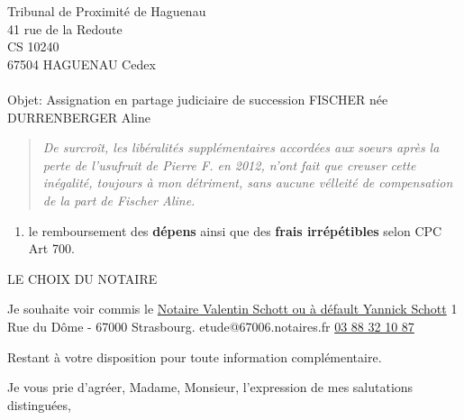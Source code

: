 \documentclass[
]{letter}
\providecommand{\tightlist}{%
  \setlength{\itemsep}{0pt}\setlength{\parskip}{0pt}}\usepackage{longtable,booktabs,array}
\begin{document}
\begin{letter}{Tribunal de Proximité de Haguenau\\41 rue de la
Redoute\\CS 10240\\67504 HAGUENAU Cedex\\ ~ \\Objet: Assignation en
partage judiciaire de succession FISCHER née DURRENBERGER Aline}
\begin{quote}
\emph{De surcroît, les libéralités supplémentaires accordées aux soeurs
après la perte de l'usufruit de Pierre F. en 2012, n'ont fait que
creuser cette inégalité, toujours à mon détriment, sans aucune vélleité
de compensation de la part de Fischer Aline.}
\end{quote}

\begin{enumerate}
\def\labelenumi{\arabic{enumi}.}
\setcounter{enumi}{2}
\tightlist
\item
  le remboursement des \textbf{dépens} ainsi que des \textbf{frais
  irrépétibles} selon CPC Art 700.
\end{enumerate}

LE CHOIX DU NOTAIRE

Je souhaite voir commis le
\href{https://www.bing.com/ck/a?!&&p=f2066ee7e9a9fe535e713659e0db4ee90bd39e3fa6431940c2eba6275c4f6b87JmltdHM9MTczOTE0NTYwMA&ptn=3&ver=2&hsh=4&fclid=04d29d0e-2a39-6ad9-1b33-89a22b806b7b&psq=notaire+Schott+strabsourg&u=a1aHR0cHM6Ly9zY2hvdHQtc2Nod2FhYi1naWxsZXQtbm90YWlyZXMuZnIv&ntb=1}{Notaire
Valentin Schott ou à défault Yannick Schott} 1 Rue du Dôme - 67000
Strasbourg. etude@67006.notaires.fr \href{tel:+33388321087}{03 88 32 10
87}

Restant à votre disposition pour toute information complémentaire.



\closing{Je vous prie d'agréer, Madame, Monsieur, l'expression de mes
salutations distinguées,}
\vfill
{}
\end{letter}
\end{document}
